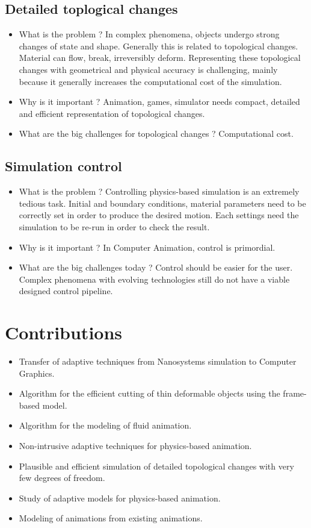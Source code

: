 \subsection{Detailed toplogical changes}
\begin{itemize}
\item What is the problem ? In complex phenomena, objects undergo strong changes of state and shape. Generally this is related to topological changes. Material can flow, break, irreversibly deform. Representing these topological changes with geometrical and physical accuracy is challenging, mainly because it generally increases the computational cost of the simulation. 
\item Why is it important ? Animation, games, simulator needs compact, detailed and efficient representation of topological changes. 
\item What are the big challenges for topological changes ? Computational cost.
\end{itemize}

\subsection{Simulation control}
\begin{itemize}
\item What is the problem ? Controlling physics-based simulation is an extremely tedious task. Initial and boundary conditions, material parameters need to be correctly set in order to produce the desired motion. Each settings need the simulation to be re-run in order to check the result.
\item Why is it important ? In Computer Animation, control is primordial.
\item What are the big challenges today ? Control should be easier for the user. Complex phenomena with evolving technologies still do not have a viable designed control pipeline.
\end{itemize}

\section{Contributions}
\begin{itemize}
    \item Transfer of adaptive techniques from Nanosystems simulation to Computer Graphics.
    \item Algorithm for the efficient cutting of thin deformable objects using the frame-based model.
    \item Algorithm for the modeling of fluid animation.
\end{itemize}
\begin{itemize}
    \item Non-intrusive adaptive techniques for physics-based animation.
    \item Plausible and efficient simulation of detailed topological changes with very few degrees of freedom.
    \item Study of adaptive models for physics-based animation.
    \item Modeling of animations from existing animations.
\end{itemize}

